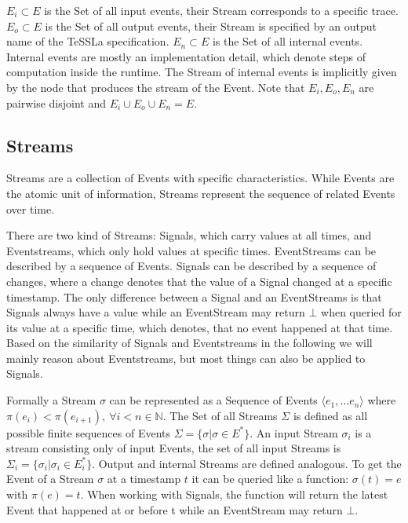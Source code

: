 \(E_i \subset E\) is the Set of all input events, their Stream corresponds to a specific trace.
\(E_o \subset E\) is the Set of all output events, their Stream is specified by an output name of the TeSSLa specification.
\(E_n \subset E\) is the Set of all internal events.
Internal events are mostly an implementation detail, which denote steps of computation inside the runtime.
The Stream of internal events is implicitly given by the node that produces the stream of the Event.
Note that \(E_i, E_o, E_n\) are pairwise disjoint and \(E_i \cup E_o \cup E_n = E\).

\subsection{Streams}
\label{sec:concepts:defs:streams}

Streams are a collection of Events with specific characteristics.
While Events are the atomic unit of information, Streams represent the sequence of related Events over time.

There are two kind of Streams: Signals, which carry values at all times, and Event\-streams, which only hold values at specific times.
EventStreams can be described by a sequence of Events.
Signals can be described by a sequence of changes, where a change denotes that the value of a Signal changed at a specific timestamp.
The only difference between a Signal and an EventStreams is that Signals always have a value while an EventStream may return \(\bot\) when queried for its value at a specific time, which denotes, that no event happened at that time.
Based on the similarity of Signals and Eventstreams in the following we will mainly reason about Eventstreams, but most things can also be applied to Signals.

Formally a Stream \(\sigma\) can be represented as a Sequence of Events \(\langle e_1, \dots e_n\rangle\) where \(\pi(e_i) < \pi(e_{i+1}),\ \forall i < n \in \mathbb{N}\).
The Set of all Streams \(\Sigma\) is defined as all possible finite sequences of Events \(\Sigma = \{\sigma | \sigma \in E^* \}\).
An input Stream \(\sigma_i\) is a stream consisting only of input Events, the set of all input Streams is \(\Sigma_i = \{\sigma_i | \sigma_i \in E_i^*\}\).
Output and internal Streams are defined analogous.
To get the Event of a Stream \(\sigma\) at a timestamp \(t\) it can be queried like a function: \(\sigma(t) = e\) with \(\pi(e) = t \).
When working with Signals, the function will return the latest Event that happened at or before t while an EventStream may return \(\bot\).

